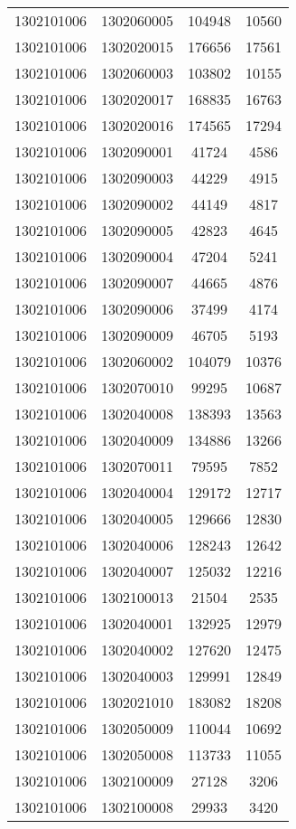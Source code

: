 \begin{longtable}[h]{llcc}
		1302101006 & 1302060005 & 104948 & 10560\\
		1302101006 & 1302020015 & 176656 & 17561\\
		1302101006 & 1302060003 & 103802 & 10155\\
		1302101006 & 1302020017 & 168835 & 16763\\
		1302101006 & 1302020016 & 174565 & 17294\\
		1302101006 & 1302090001 & 41724 & 4586\\
		1302101006 & 1302090003 & 44229 & 4915\\
		1302101006 & 1302090002 & 44149 & 4817\\
		1302101006 & 1302090005 & 42823 & 4645\\
		1302101006 & 1302090004 & 47204 & 5241\\
		1302101006 & 1302090007 & 44665 & 4876\\
		1302101006 & 1302090006 & 37499 & 4174\\
		1302101006 & 1302090009 & 46705 & 5193\\
		1302101006 & 1302060002 & 104079 & 10376\\
		1302101006 & 1302070010 & 99295 & 10687\\
		1302101006 & 1302040008 & 138393 & 13563\\
		1302101006 & 1302040009 & 134886 & 13266\\
		1302101006 & 1302070011 & 79595 & 7852\\
		1302101006 & 1302040004 & 129172 & 12717\\
		1302101006 & 1302040005 & 129666 & 12830\\
		1302101006 & 1302040006 & 128243 & 12642\\
		1302101006 & 1302040007 & 125032 & 12216\\
		1302101006 & 1302100013 & 21504 & 2535\\
		1302101006 & 1302040001 & 132925 & 12979\\
		1302101006 & 1302040002 & 127620 & 12475\\
		1302101006 & 1302040003 & 129991 & 12849\\
		1302101006 & 1302021010 & 183082 & 18208\\
		1302101006 & 1302050009 & 110044 & 10692\\
		1302101006 & 1302050008 & 113733 & 11055\\
		1302101006 & 1302100009 & 27128 & 3206\\
		1302101006 & 1302100008 & 29933 & 3420\\

\end{longtable}
